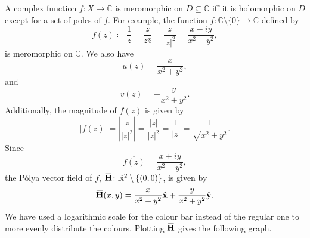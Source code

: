 \documentclass[a4paper]{article}
\newcommand{\R}{\mathbb{R}}
\newcommand{\C}{\mathbb{C}}
\newcommand{\overbar}[1]{\mkern 1.5mu\overline{\mkern-1.5mu#1\mkern-1.5mu}\mkern 1.5mu}
\theoremstyle{definition}
\begin{document}
A complex function $f \colon X \to \C$ is meromorphic on $D \subseteq \C$ iff it is holomorphic on $D$ except for a set of poles of $f$.
For example, the function $f \colon \C \setminus \{0\} \to \C$ defined by
\begin{equation*}
    f(z) \coloneq \frac{1}{z} = \frac{\bar{z}}{z\bar{z}} = \frac{\bar{z}}{\lvert z \rvert^2} = \frac{x - iy}{x^2 + y^2},
\end{equation*}
is meromorphic on $\C$.
We also have
\begin{equation*}
    u(z) = \frac{x}{x^2+y^2},
\end{equation*}
and
\begin{equation*}
    v(z) = -\frac{y}{x^2+y^2}.
\end{equation*}
Additionally, the magnitude of $f(z)$ is given by
\begin{equation*}
    \lvert f(z) \rvert = \left\lvert \frac{\bar{z}}{\lvert z \rvert^2} \right\rvert = \frac{\lvert \bar{z} \rvert}{\lvert z \rvert^2} = \frac{1}{\lvert z \rvert} = \frac{1}{\sqrt{x^2+y^2}}.
\end{equation*}
Since
\begin{equation*}
    \overline{f(z)} = \frac{x+iy}{x^2+y^2},
\end{equation*}
the P\'olya vector field of $f$, $\mathbf{\overbar{H}} \colon \R^2 \setminus \{(0,0)\}$, is given by
\begin{equation*}
    \mathbf{\overbar{H}}(x,y) = \frac{x}{x^2+y^2} \mathbf{\hat{x}} + \frac{y}{x^2+y^2} \mathbf{\hat{y}}.
\end{equation*}
We have used a logarithmic scale for the colour bar instead of the regular one to more evenly distribute the colours.
Plotting $\mathbf{\overbar{H}}$ gives the following graph.
\end{document}
